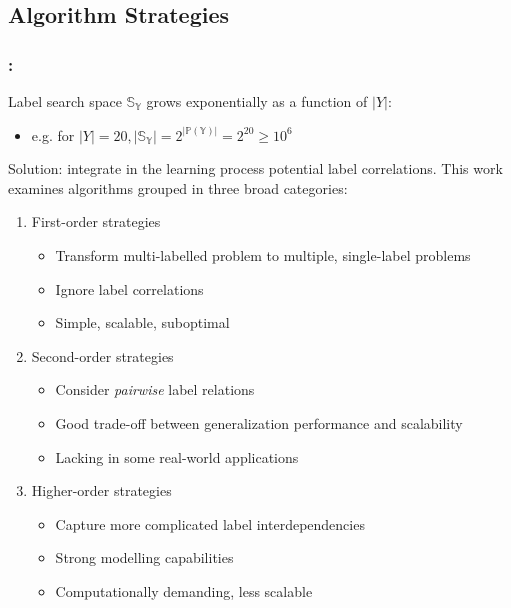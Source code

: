 \documentclass{beamer}
\begin{document}
\subsection{Algorithm Strategies}
\begin{frame}
\frametitle{\insertsection : \insertsubsection}
Label search space $\mathbb{S_Y}$ grows exponentially as a function of $|Y|$: 
\begin{itemize}
	\item e.g. for $|Y|=20, |\mathbb{S_Y}| = 2 ^ {|\mathbb{P(Y)}|} = 2^{20} \ge 10^6$
\end{itemize}
Solution: integrate in the learning process potential label correlations.
This work examines algorithms grouped in three broad categories:

\begin{enumerate}
	\item First-order strategies
		\begin{itemize}
			\item Transform multi-labelled problem to multiple, single-label problems 
			\item Ignore label correlations 
			\item Simple, scalable, suboptimal
		\end{itemize}
	\item Second-order strategies
		\begin{itemize}
			\item Consider \emph{pairwise} label relations
			\item Good trade-off between generalization performance and scalability
			\item Lacking in some real-world applications
		\end{itemize} 
	\item Higher-order strategies
		\begin{itemize}
			\item Capture more complicated label interdependencies
			\item Strong modelling capabilities
			\item Computationally demanding, less scalable
		\end{itemize}

\end{enumerate}
\end{frame}

\end{document}
